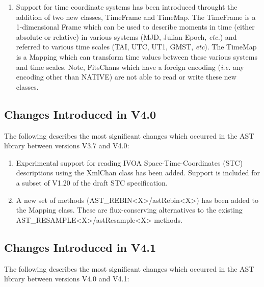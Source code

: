 \documentclass[twoside,11pt]{article}
\begin{document}
\begin{enumerate}

\item Support for time coordinate systems has been introduced
throught the addition of two new classes, TimeFrame and TimeMap.
The TimeFrame is a 1-dimensional Frame which can be used to describe
moments in time (either absolute or relative) in various systems (MJD, 
Julian Epoch, \emph{etc.}) and referred to various time scales (TAI, UTC, 
UT1, GMST, \emph{etc}). The TimeMap is a Mapping which can transform time
values between these various systems and time scales. Note,
FitsChans which have a foreign encoding (\emph{i.e.} any encoding other
than NATIVE) are not able to read or write these new classes.

\end{enumerate}


\subsection{Changes Introduced in V4.0}

The following describes the most significant changes which 
occurred in the AST library between versions V3.7 and V4.0:

\begin{enumerate}

\item Experimental support for reading IVOA Space-Time-Coordinates (STC)
descriptions using the XmlChan class has been added. Support is included
for a subset of V1.20 of the draft STC specification.

\item A new set of methods (AST\_REBIN<X>/astRebin<X>) has been added to 
the Mapping class. These are flux-conserving alternatives to the existing
AST\_RESAMPLE<X>/astResample<X> methods.

\end{enumerate}


\subsection{Changes Introduced in V4.1}

The following describes the most significant changes which 
occurred in the AST library between versions V4.0 and V4.1:
\end{document}

